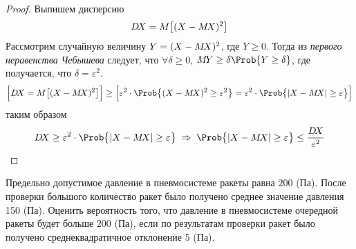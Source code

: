 \begin{proof} Выпишем дисперсию
	\[
		D\!X = M\bigl[ (X - M\!X)^2 \bigr]
	\]
	Рассмотрим случайную величину $Y = (X - M\!X)^2$, где $Y \geq 0$. Тогда из \emph{первого неравенства Чебышева} следует, что $\forall\delta\geq 0$, $\my\geq\delta\Prob\{ Y\geq\delta \}$, где получается, что $\delta = \varepsilon^2$.
	\[
		\Bigl[\dx = M\bigl[ (X - \mx)^2 \bigr]\Bigr] \geq \Bigl[\varepsilon^2\cdot\Prob\bigl\{ (X - \mx)^2\geq\varepsilon^2 \bigr\} = \varepsilon^2\cdot\Prob\bigl\{ |X - \mx|\geq\varepsilon \bigr\}\Bigr]
	\]
	таким образом
	\[
		\dx \geq \varepsilon^2\cdot\Prob\bigl\{ |X - \mx|\geq\varepsilon \bigr\} \Rarrow \Prob\bigl\{ |X - \mx|\geq\varepsilon \bigr\} \leq \frac{\dx}{\varepsilon^2}
	\]
\end{proof}

\begin{exm}
	Предельно допустимое давление в пневмосистеме ракеты равна $200$ (Па). После проверки большого количество ракет было получено среднее значение давления 150 (Па). Оценить вероятность того, что давление в пневмосистеме очередной ракеты будет больше $200$ (Па), если по результатам проверки  ракет было получено среднеквадратичное отклонение 5 (Па).
\end{exm}


